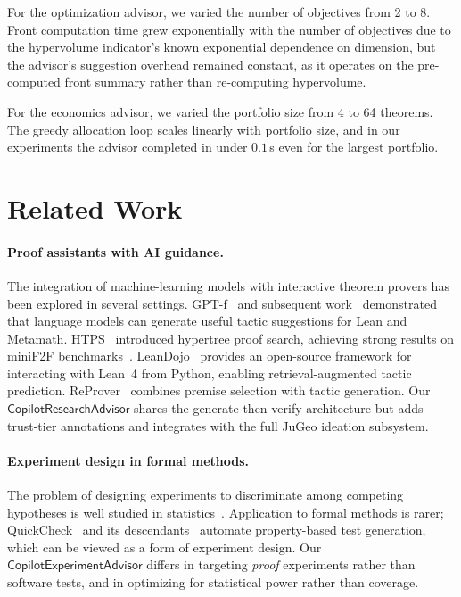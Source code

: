 \documentclass[11pt]{article}
\begin{document}
For the optimization advisor, we varied the number of
objectives from 2 to 8.  Front computation time grew
exponentially with the number of objectives due to the
hypervolume indicator's known exponential dependence on
dimension, but the advisor's suggestion overhead remained
constant, as it operates on the pre-computed front summary
rather than re-computing hypervolume.

For the economics advisor, we varied the portfolio size from
4 to 64 theorems.  The greedy allocation loop scales linearly
with portfolio size, and in our experiments the advisor
completed in under $0.1$\,s even for the largest portfolio.

\section{Related Work}\label{sec:related}

\paragraph{Proof assistants with AI guidance.}
The integration of machine-learning models with interactive
theorem provers has been explored in several settings.
GPT-f~\cite{polu2020gptf} and subsequent
work~\cite{polu2022formal} demonstrated that language models can
generate useful tactic suggestions for Lean and Metamath.
HTPS~\cite{lample2022hypertree} introduced hypertree proof
search, achieving strong results on miniF2F
benchmarks~\cite{zheng2022minif2f}.  LeanDojo~\cite{yang2023leandojo}
provides an open-source framework for interacting with Lean~4
from Python, enabling retrieval-augmented tactic prediction.
ReProver~\cite{yang2023leandojo} combines premise selection with
tactic generation.  Our $\mathsf{CopilotResearchAdvisor}$ shares
the generate-then-verify architecture but adds trust-tier
annotations and integrates with the full JuGeo ideation
subsystem.

\paragraph{Experiment design in formal methods.}
The problem of designing experiments to discriminate among
competing hypotheses is well studied in
statistics~\cite{chaloner1995bayesian,ryan2016review}.
Application to formal methods is rarer; QuickCheck~\cite{claessen2000quickcheck}
and its descendants~\cite{lampropoulos2017generating} automate
property-based test generation, which can be viewed as a form of
experiment design.  Our $\mathsf{CopilotExperimentAdvisor}$
differs in targeting \emph{proof} experiments rather than
software tests, and in optimizing for statistical power rather
than coverage.
\end{document}
